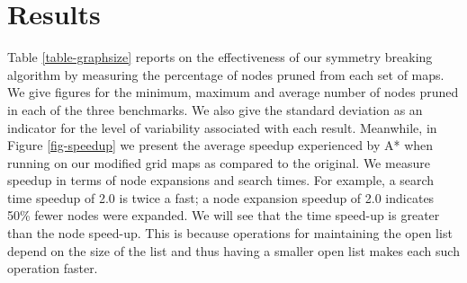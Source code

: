 \section{Results}
\label{sec-results}
Table \ref{table-graphsize} reports on the effectiveness of our symmetry breaking
algorithm by measuring the percentage of nodes pruned from each set of maps.
We give figures for the minimum, maximum and average number of nodes pruned
in each of the three benchmarks.
We also give the standard deviation as an indicator for the level of variability
associated with each result.
Meanwhile, in Figure \ref{fig-speedup} we present the average speedup experienced by A* 
when running on our modified grid maps as compared to the original.
We measure speedup in terms of node expansions and search times.
For example, a search time speedup of 2.0 is twice a fast; a node expansion speedup of 2.0 
indicates 50\% fewer nodes were expanded.
We will see that the time speed-up is greater than the node speed-up.
This is because operations for maintaining the open list depend on the size of the list
and thus having a smaller open list makes each such operation faster.

